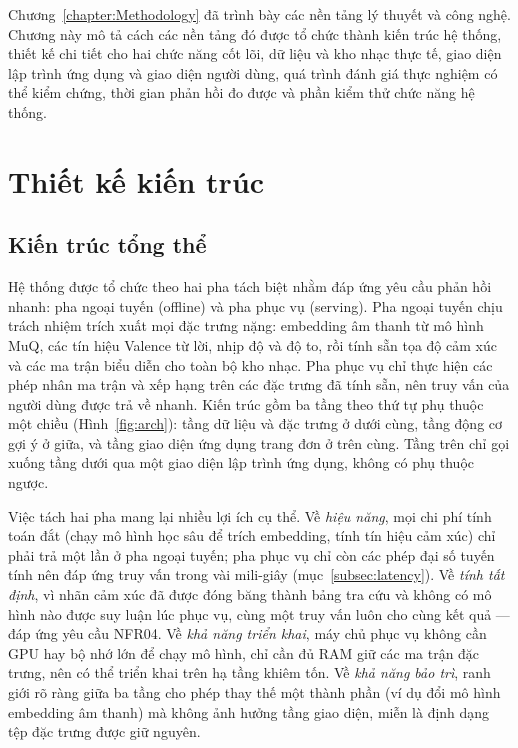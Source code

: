 \documentclass[../DoAn.tex]{subfiles}
\begin{document}
Chương~\ref{chapter:Methodology} đã trình bày các nền tảng lý thuyết và công nghệ. Chương này mô tả cách các nền tảng đó được tổ chức thành kiến trúc hệ thống, thiết kế chi tiết cho hai chức năng cốt lõi, dữ liệu và kho nhạc thực tế, giao diện lập trình ứng dụng và giao diện người dùng, quá trình đánh giá thực nghiệm có thể kiểm chứng, thời gian phản hồi đo được và phần kiểm thử chức năng hệ thống.

\section{Thiết kế kiến trúc}
\label{section:4.1}

\subsection{Kiến trúc tổng thể}
\label{subsection:4.1.1}
Hệ thống được tổ chức theo hai pha tách biệt nhằm đáp ứng yêu cầu phản hồi nhanh: pha ngoại tuyến (offline) và pha phục vụ (serving). Pha ngoại tuyến chịu trách nhiệm trích xuất mọi đặc trưng nặng: embedding âm thanh từ mô hình MuQ, các tín hiệu Valence từ lời, nhịp độ và độ to, rồi tính sẵn tọa độ cảm xúc và các ma trận biểu diễn cho toàn bộ kho nhạc. Pha phục vụ chỉ thực hiện các phép nhân ma trận và xếp hạng trên các đặc trưng đã tính sẵn, nên truy vấn của người dùng được trả về nhanh. Kiến trúc gồm ba tầng theo thứ tự phụ thuộc một chiều (Hình~\ref{fig:arch}): tầng dữ liệu và đặc trưng ở dưới cùng, tầng động cơ gợi ý ở giữa, và tầng giao diện ứng dụng trang đơn ở trên cùng. Tầng trên chỉ gọi xuống tầng dưới qua một giao diện lập trình ứng dụng, không có phụ thuộc ngược.

Việc tách hai pha mang lại nhiều lợi ích cụ thể. Về \textit{hiệu năng}, mọi chi phí tính toán đắt (chạy mô hình học sâu để trích embedding, tính tín hiệu cảm xúc) chỉ phải trả một lần ở pha ngoại tuyến; pha phục vụ chỉ còn các phép đại số tuyến tính nên đáp ứng truy vấn trong vài mili-giây (mục~\ref{subsec:latency}). Về \textit{tính tất định}, vì nhãn cảm xúc đã được đóng băng thành bảng tra cứu và không có mô hình nào được suy luận lúc phục vụ, cùng một truy vấn luôn cho cùng kết quả --- đáp ứng yêu cầu NFR04. Về \textit{khả năng triển khai}, máy chủ phục vụ không cần GPU hay bộ nhớ lớn để chạy mô hình, chỉ cần đủ RAM giữ các ma trận đặc trưng, nên có thể triển khai trên hạ tầng khiêm tốn. Về \textit{khả năng bảo trì}, ranh giới rõ ràng giữa ba tầng cho phép thay thế một thành phần (ví dụ đổi mô hình embedding âm thanh) mà không ảnh hưởng tầng giao diện, miễn là định dạng tệp đặc trưng được giữ nguyên.
\end{document}
